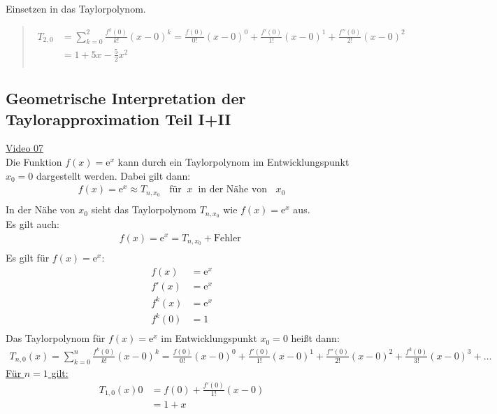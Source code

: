 \textbullet\;\; Einsetzen in das Taylorpolynom.\\
\begin{quote}
\begin{align*}
T_{2,0}&=\sum\limits_{k=0}^{2}\frac{f^k(0)}{k!}(x-0)^k=\frac{f(0)}{0!}(x-0)^0+\frac{f'(0)}{1!}(x-0)^1+\frac{f''(0)}{2!}(x-0)^2\\
&=1+5x-\frac{5}{2}x^2\\
\end{align*}
\end{quote}
\subsection{Geometrische Interpretation der Taylorapproximation Teil I+II}
\href{https://youtu.be/fznq-R-W_NQ}{Video 07}\\
Die Funktion $ f(x)=\mathrm{e}^x $ kann durch ein Taylorpolynom im Entwicklungspunkt $ x_0=0 $ dargestellt werden. Dabei gilt dann:\\
\begin{align*}
f(x)=\mathrm{e}^x\approx T_{n,x_0}\;\;\text{ für}\;\;x\;\;\text{in der Nähe von }\;\;x_0\\
\end{align*}
In der Nähe von $ x_0 $ sieht das Taylorpolynom $T_{n,x_0}  $ wie $ f(x)=\mathrm{e}^x $ aus.\\
Es gilt auch:\\
\begin{align*}
f(x)=\mathrm{e}^x=T_{n,x_0}+\text{Fehler }\\
\end{align*}
Es gilt für $ f(x)=\mathrm{e}^x $:\\
\begin{align*}
f(x)&=\mathrm{e}^x\\
f'(x)&=\mathrm{e}^x\\
f^{k}(x)&=\mathrm{e}^x\\
f^{k}(0)&=1\\
\end{align*}
Das Taylorpolynom für $ f(x)=\mathrm{e}^x $ im Entwicklungspunkt $ x_0=0 $ heißt dann:\\
\begin{align*}
T_{n,0}(x)=\sum\limits_{k=0}^{n}\frac{f^k(0)}{k!}(x-0)^k=\frac{f(0)}{0!}(x-0)^0+\frac{f'(0)}{1!}(x-0)^1+\frac{f''(0)}{2!}(x-0)^2+\frac{f^{3}(0)}{3!}(x-0)^3+\ldots
\end{align*}
\underline{Für $ n=1 $ gilt:}\\
\begin{align*}
T_{1,0}(x)0&=f(0)+\frac{f'(0)}{1!}(x-0)\\
&=1+x\\
\end{align*}

